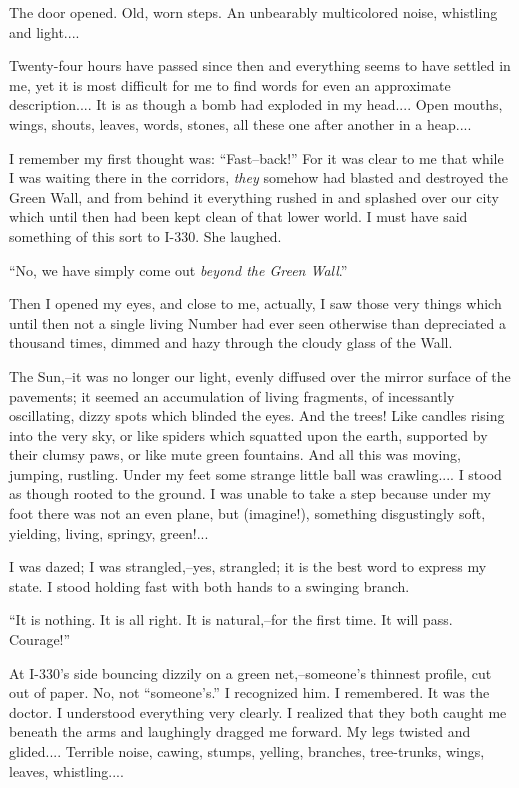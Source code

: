 \documentclass[11pt,openany]{book}
\begin{document}
The door opened. Old, worn steps. An unbearably multicolored noise, whistling and light....

    

Twenty-four hours have passed since then and everything seems to have settled in me, yet it is most difficult for me to find words for even an approximate description.... It is as though a bomb had exploded in my head.... Open mouths, wings, shouts, leaves, words, stones, all these one after another in a heap....

I remember my first thought was: ``Fast--back!'' For it was clear to me that while I was waiting there in the corridors, \emph{they} somehow had blasted and destroyed the Green Wall, and from behind it everything rushed in and splashed over our city which until then had been kept clean of that lower world. I must have said something of this sort to I-330. She laughed.

``No, we have simply come out \emph{beyond the Green Wall}.''

Then I opened my eyes, and close to me, actually, I saw those very things which until then not a single living Number had ever seen otherwise than depreciated a thousand times, dimmed and hazy through the cloudy glass of the Wall.

The Sun,--it was no longer our light, evenly diffused over the mirror surface of the pavements; it seemed an accumulation of living fragments, of incessantly oscillating, dizzy spots which blinded the eyes. And the trees! Like candles rising into the very sky, or like spiders which squatted upon the earth, supported by their clumsy paws, or like mute green fountains. And all this was moving, jumping, rustling. Under my feet some strange little ball was crawling.... I stood as though rooted to the ground. I was unable to take a step because under my foot there was not an even plane, but (imagine!), something disgustingly soft, yielding, living, springy, green!...

I was dazed; I was strangled,--yes, strangled; it is the best word to express my state. I stood holding fast with both hands to a swinging branch.

``It is nothing. It is all right. It is natural,--for the first time. It will pass. Courage!''

At I-330's side bouncing dizzily on a green net,--someone's thinnest profile, cut out of paper. No, not ``someone's.'' I recognized him. I remembered. It was the doctor. I understood everything very clearly. I realized that they both caught me beneath the arms and laughingly dragged me forward. My legs twisted and glided.... Terrible noise, cawing, stumps, yelling, branches, tree-trunks, wings, leaves, whistling....
\end{document}
